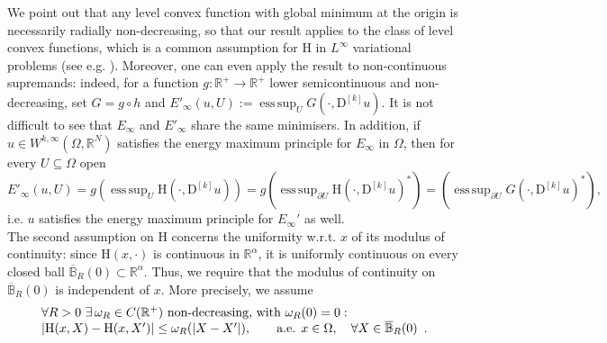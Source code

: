 \documentclass[a4paper,11pt]{article}
\numberwithin{equation}{section}
\newcommand{\numberset}{\mathbb}
\newcommand{\Om}{\Omega}
\newcommand{\R}{\numberset{R}}
\newcommand{\rom}{\mathrm}
\DeclareMathOperator*{\esssup}{ess\,sup}
\theoremstyle{definition}
\begin{document}
We point out that any level convex function with global minimum at the origin is necessarily radially non-decreasing, so that our result applies to the class of level convex functions, which is a common assumption for $\rom{H}$ in $L^\infty$ variational problems (see e.g. \cite{BJW}).
 Moreover, one can even apply the result to non-continuous supremands: indeed, for a function $g:\R^+\to\R^+$ lower semicontinuous and non-decreasing, set $G=g\circ h$ and $E'_\infty(u,U):=\esssup_U G(\cdot,\mathrm D^{[k]} u)$. It is not difficult to see that $E_\infty$ and $E'_\infty$ share the same minimisers. In addition, if $u\in W^{k,\infty}(\Om,\R^N)$ satisfies the energy maximum principle for $E_\infty$ in $\Om$, then for every $U\subseteq\Om$ open
$$
E'_\infty(u,U)=g\left(\esssup_U \rom{H}(\cdot, \mathrm D^{[k]}u)\right)=g\left(\esssup_{\partial U}\rom{H}(\cdot, \mathrm D^{[k]}u)^*\right)=\left(\esssup_{\partial U}G(\cdot, \mathrm D^{[k]}u)^*\right),
$$ 
i.e. $u$ satisfies the energy maximum principle for $E_\infty'$ as well.\\
The second assumption on $\rom{H}$ concerns the uniformity w.r.t. $x$ of its modulus of continuity: since $\rom{H}(x,\cdot)$ is continuous in $\R^\alpha$, it is uniformly continuous on every closed ball $\overline{\mathbb B}_R(0)\subset\R^\alpha$. Thus, we require that the modulus of continuity on $\overline{\mathbb B}_R(0)$ is independent of $x$. More precisely, we assume
\begin{equation}\label{uniformity}
\begin{array}{l}
\forall R>0 \,\,\exists\, \omega_R\in C(\mathbb{R}^+)\ \text{non-decreasing, with } \omega_R(0)=0: \\
\multicolumn{1}{c}{|\rom{H}(x,X)-\rom{H}(x,X')|\leq\omega_R(|X-X'|),\qquad \text{a.e. } x\in\Omega,\quad\forall X\in \overline{\mathbb B}_R(0)}.
\end{array}
\end{equation}
\end{document}
